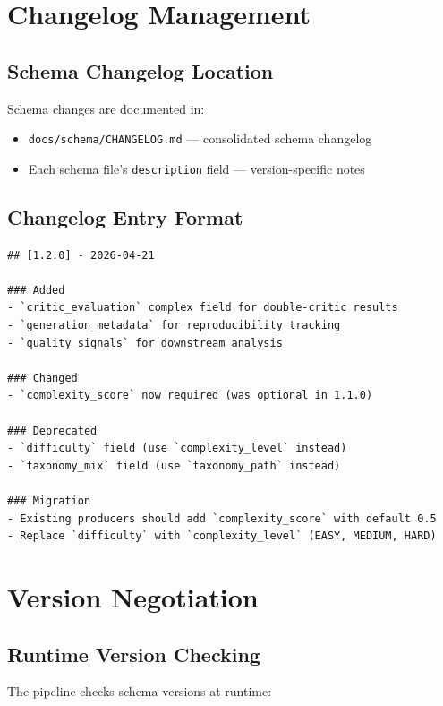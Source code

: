 \documentclass[12pt,a4paper,twoside]{report}
\begin{document}
\section{Changelog Management}

\subsection{Schema Changelog Location}

Schema changes are documented in:
\begin{itemize}
\item \texttt{docs/schema/CHANGELOG.md} --- consolidated schema changelog
\item Each schema file's \texttt{description} field --- version-specific notes
\end{itemize}

\subsection{Changelog Entry Format}

\begin{lstlisting}[basicstyle=\ttfamily\small,caption={Changelog entry format.}]
## [1.2.0] - 2026-04-21

### Added
- `critic_evaluation` complex field for double-critic results
- `generation_metadata` for reproducibility tracking
- `quality_signals` for downstream analysis

### Changed
- `complexity_score` now required (was optional in 1.1.0)

### Deprecated
- `difficulty` field (use `complexity_level` instead)
- `taxonomy_mix` field (use `taxonomy_path` instead)

### Migration
- Existing producers should add `complexity_score` with default 0.5
- Replace `difficulty` with `complexity_level` (EASY, MEDIUM, HARD)
\end{lstlisting}

\section{Version Negotiation}

\subsection{Runtime Version Checking}

The pipeline checks schema versions at runtime:
\end{document}
